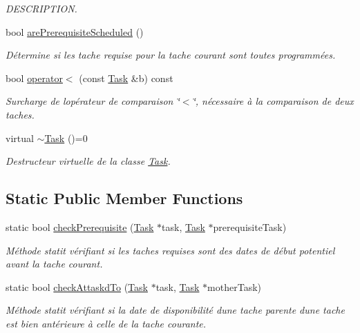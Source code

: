 \begin{DoxyCompactItemize}
\begin{DoxyCompactList}\small\item\em D\+E\+S\+C\+R\+I\+P\+T\+I\+O\+N. \end{DoxyCompactList}\item 
bool \hyperlink{class_task_ac6609b3e2460c657f573f944c7970942}{are\+Prerequisite\+Scheduled} ()
\begin{DoxyCompactList}\small\item\em Détermine si les tache requise pour la tache courant sont toutes programmées. \end{DoxyCompactList}\item 
bool \hyperlink{class_task_ae0af351b77852045fe6107fd81f5cf0e}{operator$<$} (const \hyperlink{class_task}{Task} \&b) const 
\begin{DoxyCompactList}\small\item\em Surcharge de l\textquotesingle{}opérateur de comparaison \char`\"{}$<$\char`\"{}, nécessaire à la comparaison de deux taches. \end{DoxyCompactList}\item 
virtual \hyperlink{class_task_a2deed8c5e320f3c09a842a2cb944457e}{$\sim$\+Task} ()=0
\begin{DoxyCompactList}\small\item\em Destructeur virtuelle de la classe \hyperlink{class_task}{Task}. \end{DoxyCompactList}\end{DoxyCompactItemize}
\subsection*{Static Public Member Functions}
\begin{DoxyCompactItemize}
\item 
static bool \hyperlink{class_task_a0182666815bb65cf7e88422eb71dd831}{check\+Prerequisite} (\hyperlink{class_task}{Task} $\ast$task, \hyperlink{class_task}{Task} $\ast$prerequisite\+Task)
\begin{DoxyCompactList}\small\item\em Méthode statit vérifiant si les taches requises sont des dates de début potentiel avant la tache courant. \end{DoxyCompactList}\item 
static bool \hyperlink{class_task_a06760406c8dbfc2eae5c39f22164f7a0}{check\+Attaskd\+To} (\hyperlink{class_task}{Task} $\ast$task, \hyperlink{class_task}{Task} $\ast$mother\+Task)
\begin{DoxyCompactList}\small\item\em Méthode statit vérifiant si la date de disponibilité d\textquotesingle{}une tache parente d\textquotesingle{}une tache est bien antérieure à celle de la tache courante. \end{DoxyCompactList}\end{DoxyCompactItemize}
